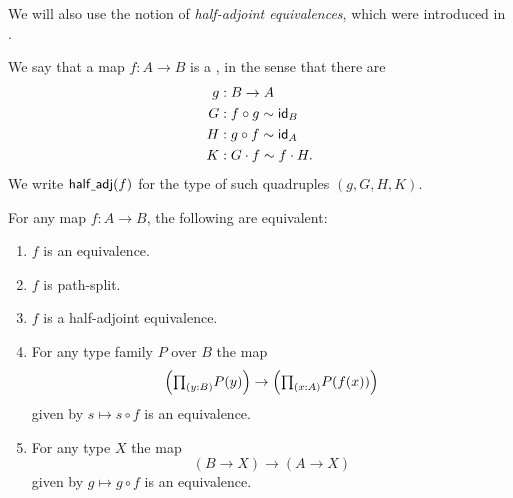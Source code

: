 We will also use the notion of \emph{half-adjoint equivalences}, which were introduced in \cite{hottbook}.

\begin{defn}
We say that a map $f:A\to B$ is a , in the sense that there are
\begin{align*}
g & : B \to A\\
G & : f\circ g \htpy \idfunc[B] \\
H & : g\circ f \htpy \idfunc[A] \\
K & : G\cdot f \htpy f\cdot H.
\end{align*}
We write $\halfadj(f)$ for the type of such quadruples $(g,G,H,K)$.
\end{defn}

\begin{prp}\label{ex:equiv_precomp}
For any map $f:A\to B$, the following are equivalent:
\begin{enumerate}
\item $f$ is an equivalence.
\item $f$ is path-split.
\item $f$ is a half-adjoint equivalence.
\item For any type family $P$ over $B$ the map
\begin{equation*}
\Big(\prd{y:B}P(y)\Big)\to\Big(\prd{x:A}P(f(x))\Big)
\end{equation*}
given by $s\mapsto s\circ f$ is an equivalence.
\item For any type $X$ the map
\begin{equation*}
(B\to X)\to (A\to X)
\end{equation*}
given by $g\mapsto g\circ f$ is an equivalence. 
\end{enumerate}
\end{prp}

